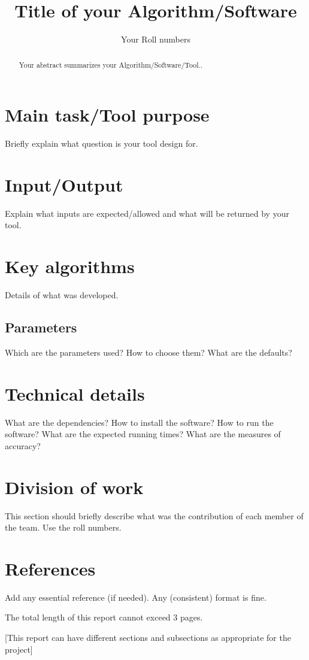 \documentclass{article}
\title{Title of your Algorithm/Software}
\author{Your Roll numbers}
\begin{document}
\maketitle

\begin{abstract}
Your abstract summarizes your Algorithm/Software/Tool..
\end{abstract}

\section{Main task/Tool purpose}

Briefly explain what question is your tool design for.

\section{Input/Output}

Explain what inputs are expected/allowed and what will be returned by your tool.

\section{Key algorithms}

Details of what was developed.

\subsection{Parameters}

Which are the parameters used? How to choose them? What are the defaults?

\section{Technical details}

What are the dependencies? How to install the software? How to run the software? What are the expected running times? What are the measures of accuracy? 

\section{Division of work}

This section should briefly describe what was the contribution of each member of the team. Use the roll numbers.

\section{References}

Add any essential reference (if needed). Any (consistent) format is fine.

The total length of this report cannot exceed 3 pages.

[This report can have different sections and subsections as appropriate for the project]
\end{document}
